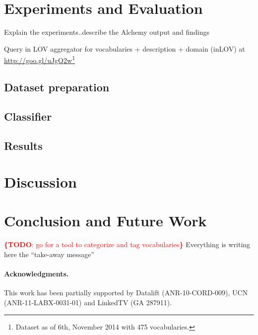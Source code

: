 \documentclass[runningheads,a4paper]{llncs}
\newcommand{\todo}[1]{\noindent\textcolor{red}{{\bf \{TODO}: #1{\bf \}}}}
\begin{document}

\section{Experiments and Evaluation}
\label{sec:classification}
Explain the experiments..describe the Alchemy output and findings

Query in LOV aggregator for vocabularies + description + domain (inLOV) at \url{http://goo.gl/uJgQ2w}\footnote{Dataset as of 6th, November 2014 with 475 vocabularies.}

\subsection{Dataset preparation}

\subsection{Classifier}

\subsection{Results}

\section{Discussion}
\label{sec:discussion}





\section{Conclusion and Future Work}
\label{sec:conclusion}
\todo{go for a tool to categorize and tag vocabularies}
Everything is writing here the ``take-away message''



\paragraph{\textbf{Acknowledgments.}} %
This work has been partially supported by Datalift (ANR-10-CORD-009), UCN (ANR-11-LABX-0031-01) and LinkedTV (GA 287911).


\nocite{*}

\end{document}
